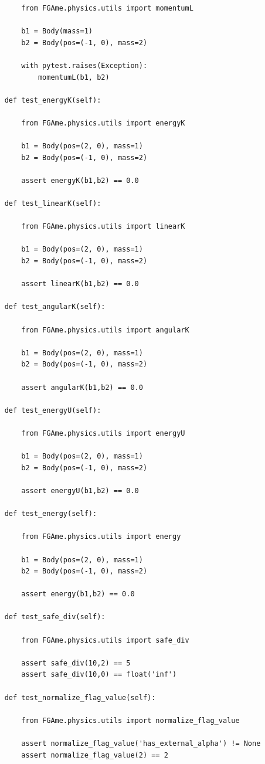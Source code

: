 \begin{anexosenv}
\begin{lstlisting}
        from FGAme.physics.utils import momentumL

        b1 = Body(mass=1)
        b2 = Body(pos=(-1, 0), mass=2)

        with pytest.raises(Exception):
            momentumL(b1, b2)

    def test_energyK(self):

        from FGAme.physics.utils import energyK

        b1 = Body(pos=(2, 0), mass=1)
        b2 = Body(pos=(-1, 0), mass=2)

        assert energyK(b1,b2) == 0.0

    def test_linearK(self):

        from FGAme.physics.utils import linearK

        b1 = Body(pos=(2, 0), mass=1)
        b2 = Body(pos=(-1, 0), mass=2)

        assert linearK(b1,b2) == 0.0

    def test_angularK(self):

        from FGAme.physics.utils import angularK

        b1 = Body(pos=(2, 0), mass=1)
        b2 = Body(pos=(-1, 0), mass=2)

        assert angularK(b1,b2) == 0.0

    def test_energyU(self):

        from FGAme.physics.utils import energyU

        b1 = Body(pos=(2, 0), mass=1)
        b2 = Body(pos=(-1, 0), mass=2)

        assert energyU(b1,b2) == 0.0

    def test_energy(self):

        from FGAme.physics.utils import energy

        b1 = Body(pos=(2, 0), mass=1)
        b2 = Body(pos=(-1, 0), mass=2)

        assert energy(b1,b2) == 0.0

    def test_safe_div(self):

        from FGAme.physics.utils import safe_div

        assert safe_div(10,2) == 5
        assert safe_div(10,0) == float('inf')

    def test_normalize_flag_value(self):

        from FGAme.physics.utils import normalize_flag_value

        assert normalize_flag_value('has_external_alpha') != None
        assert normalize_flag_value(2) == 2


\end{lstlisting}
\end{anexosenv}
